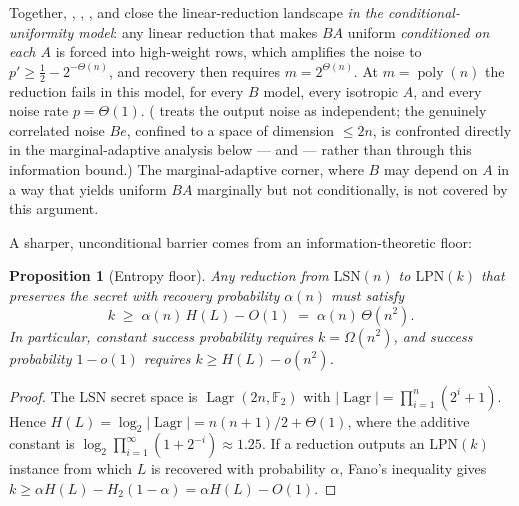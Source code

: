 \documentclass[11pt,a4paper]{article}
\theoremstyle{plain}
\newtheorem{proposition}[theorem]{Proposition}
\theoremstyle{definition}
\newcommand{\F}{\mathbb{F}}
\DeclareMathOperator{\Lagr}{Lagr}
\begin{document}
Together, , , , and  close the linear-reduction landscape \emph{in the conditional-uniformity model}: any linear reduction that makes $BA$ uniform \emph{conditioned on each $A$} is forced into high-weight rows, which amplifies the noise to $p'\ge \tfrac12-2^{-\Theta(n)}$, and recovery then requires $m=2^{\Theta(n)}$.  At $m=\operatorname{poly}(n)$ the reduction fails in this model, for every $B$ model, every isotropic $A$, and every noise rate $p=\Theta(1)$.  ( treats the output noise as independent; the genuinely correlated noise $Be$, confined to a space of dimension $\le 2n$, is confronted directly in the marginal-adaptive analysis below ---  and  --- rather than through this information bound.)  The marginal-adaptive corner, where $B$ may depend on $A$ in a way that yields uniform $BA$ marginally but not conditionally, is not covered by this argument.

A sharper, unconditional barrier comes from an information-theoretic floor:

\begin{proposition}[Entropy floor]
\label{prop:entropy-floor}
Any reduction from $\mathrm{LSN}(n)$ to $\mathrm{LPN}(k)$ that preserves the secret with recovery probability $\alpha(n)$ must satisfy
\[
k \;\geq\; \alpha(n)\,H(L) - O(1) \;=\; \alpha(n)\,\Theta(n^2).
\]
In particular, constant success probability requires $k=\Omega(n^2)$, and success probability $1-o(1)$ requires $k \geq H(L)-o(n^2)$.
\end{proposition}

\begin{proof}
The LSN secret space is $\Lagr(2n,\F_2)$ with $|\Lagr| = \prod_{i=1}^n (2^i+1)$. Hence $H(L) = \log_2|\Lagr| = n(n+1)/2 + \Theta(1)$, where the additive constant is $\log_2\prod_{i=1}^{\infty}(1+2^{-i}) \approx 1.25$. If a reduction outputs an $\mathrm{LPN}(k)$ instance from which $L$ is recovered with probability $\alpha$, Fano's inequality gives $k \geq \alpha H(L) - H_2(1-\alpha) = \alpha H(L) - O(1)$.
\end{proof}
\end{document}

